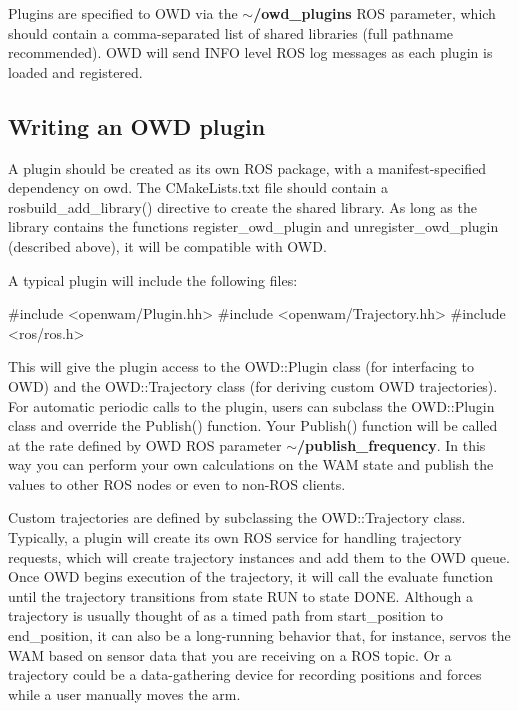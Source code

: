 Plugins are specified to O\-W\-D via the {\bfseries $\sim$/owd\-\_\-plugins} R\-O\-S parameter, which should contain a comma-\/separated list of shared libraries (full pathname recommended). O\-W\-D will send I\-N\-F\-O level R\-O\-S log messages as each plugin is loaded and registered.\hypertarget{plugins_plugin_writing}{}\subsection{Writing an O\-W\-D plugin}\label{plugins_plugin_writing}
A plugin should be created as its own R\-O\-S package, with a manifest-\/specified dependency on owd. The C\-Make\-Lists.\-txt file should contain a rosbuild\-\_\-add\-\_\-library() directive to create the shared library. As long as the library contains the functions register\-\_\-owd\-\_\-plugin and unregister\-\_\-owd\-\_\-plugin (described above), it will be compatible with O\-W\-D.

A typical plugin will include the following files\-:

\begin{DoxyVerb}#include <openwam/Plugin.hh>
#include <openwam/Trajectory.hh>
#include <ros/ros.h>
\end{DoxyVerb}


This will give the plugin access to the O\-W\-D\-::\-Plugin class (for interfacing to O\-W\-D) and the O\-W\-D\-::\-Trajectory class (for deriving custom O\-W\-D trajectories). For automatic periodic calls to the plugin, users can subclass the O\-W\-D\-::\-Plugin class and override the Publish() function. Your Publish() function will be called at the rate defined by O\-W\-D R\-O\-S parameter {\bfseries $\sim$/publish\-\_\-frequency}. In this way you can perform your own calculations on the W\-A\-M state and publish the values to other R\-O\-S nodes or even to non-\/\-R\-O\-S clients.

Custom trajectories are defined by subclassing the O\-W\-D\-::\-Trajectory class. Typically, a plugin will create its own R\-O\-S service for handling trajectory requests, which will create trajectory instances and add them to the O\-W\-D queue. Once O\-W\-D begins execution of the trajectory, it will call the evaluate function until the trajectory transitions from state R\-U\-N to state D\-O\-N\-E. Although a trajectory is usually thought of as a timed path from start\-\_\-position to end\-\_\-position, it can also be a long-\/running behavior that, for instance, servos the W\-A\-M based on sensor data that you are receiving on a R\-O\-S topic. Or a trajectory could be a data-\/gathering device for recording positions and forces while a user manually moves the arm.


